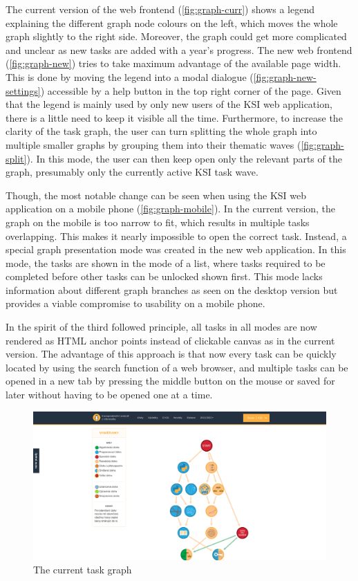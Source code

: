\documentclass[
  digital, %
  oneside, %
  lof,     %
  nolot,     %
]{fithesis4}
\begin{document}
{The current version of the web frontend (\autoref{fig:graph-curr}) shows a legend explaining the different graph node colours on the left, which moves the whole graph slightly to the right side. Moreover, the graph could get more complicated and unclear as new tasks are added with a year's progress. The new web frontend (\autoref{fig:graph-new}) tries to take maximum advantage of the available page width. This is done by moving the legend into a modal dialogue (\autoref{fig:graph-new-settings}) accessible by a help button in the top right corner of the page. Given that the legend is mainly used by only new users of the \acrshort{KSI} web application, there is a little need to keep it visible all the time. Furthermore, to increase the clarity of the task graph, the user can turn splitting the whole graph into multiple smaller graphs by grouping them into their thematic waves (\autoref{fig:graph-split}). In this mode, the user can then keep open only the relevant parts of the graph, presumably only the currently active \acrshort{KSI} task wave.

Though, the most notable change can be seen when using the \acrshort{KSI} web application on a mobile phone (\autoref{fig:graph-mobile}). In the current version, the graph on the mobile is too narrow to fit, which results in multiple tasks overlapping. This makes it nearly impossible to open the correct task. Instead, a special graph presentation mode was created in the new web application. In this mode, the tasks are shown in the mode of a list, where tasks required to be completed before other tasks can be unlocked shown first. This mode lacks information about different graph branches as seen on the desktop version but provides a viable compromise to usability on a mobile phone.

In the spirit of the third followed principle, all tasks in all modes are now rendered as \acrshort{HTML} anchor points instead of clickable canvas as in the current version. The advantage of this approach is that now every task can be quickly located by using the search function of a web browser, and multiple tasks can be opened in a new tab by pressing the middle button on the mouse or saved for later without having to be opened one at a time.

\begin{figure}
\includegraphics[width=\textwidth]{assets/img/graph_curr}
\caption{The current task graph}
\label{fig:graph-curr}
\end{figure}

}
\end{document}
